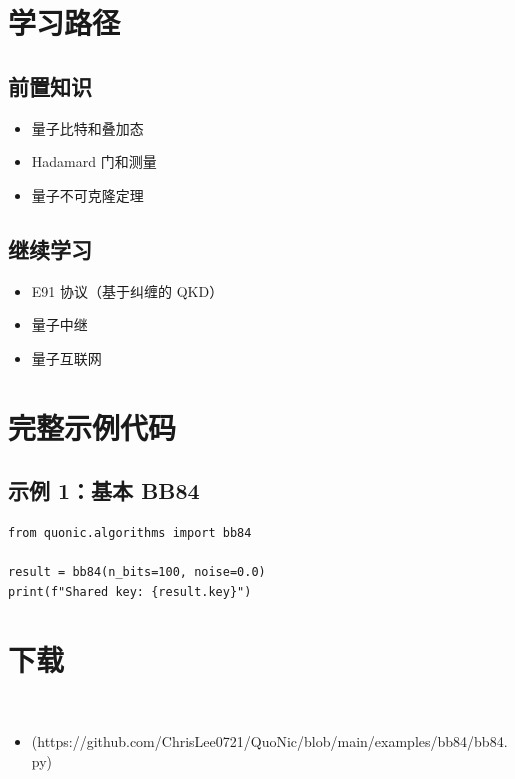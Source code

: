 \documentclass[12pt,a4paper]{article}
\begin{document}
\section{学习路径}

\subsection{前置知识}
\begin{itemize}
  \item 量子比特和叠加态
  \item Hadamard 门和测量
  \item 量子不可克隆定理
\end{itemize}

\subsection{继续学习}
\begin{itemize}
  \item E91 协议（基于纠缠的 QKD）
  \item 量子中继
  \item 量子互联网
\end{itemize}

\section{完整示例代码}

\subsection{示例 1：基本 BB84}

\begin{lstlisting}[style=python]
from quonic.algorithms import bb84

result = bb84(n_bits=100, noise=0.0)
print(f"Shared key: {result.key}")
\end{lstlisting}


\section{下载}

\begin{itemize}
  \item [bb84.py](https://github.com/ChrisLee0721/QuoNic/blob/main/examples/bb84/bb84.py)
\end{itemize}
\end{document}

